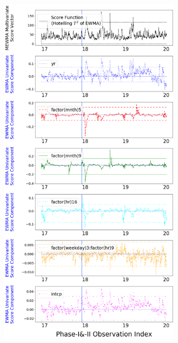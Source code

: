 \documentclass[twoside,11pt]{article}
\begin{document}
\begin{figure}[H]
\begin{subfigure}[t]{0.304\linewidth}
     \captionsetup{width=.95\linewidth}
     \caption{}
     \label{fig:bs_norm_retro_narrow}
\end{subfigure}
\begin{subfigure}[t]{0.374\linewidth}
     \centering
         \includegraphics[width=1.0\textwidth, trim=.0in .0in .0in .0in, clip]{../figures/v14/bike_sharing/reg_lin_PI_D_2/neg_single_bike_fisher_mlines_with_regu_1e-08_0_0001_0_01_99_99.png}

\end{subfigure}
\end{figure}
\end{document}
